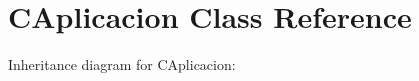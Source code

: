 \hypertarget{classCAplicacion}{}\section{C\+Aplicacion Class Reference}
\label{classCAplicacion}


Inheritance diagram for C\+Aplicacion\+:
